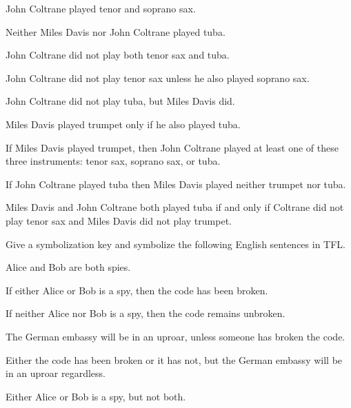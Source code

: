 \begin{compactlist}
\item John Coltrane played tenor and soprano sax. %
\item Neither Miles Davis nor John Coltrane played tuba. %
\item John Coltrane did not play both tenor sax and tuba.  %
\item John Coltrane did not play tenor sax unless he also played soprano sax. %
\item John Coltrane did not play tuba, but Miles Davis did. %
\item Miles Davis played trumpet only if he also played tuba. %
\item If Miles Davis played trumpet, then John Coltrane played at least one of these three instruments: tenor sax, soprano sax, or tuba. %
\item If John Coltrane played tuba then Miles Davis played neither trumpet nor tuba. %
\item Miles Davis and John Coltrane both played tuba if and only if Coltrane did not play tenor sax and Miles Davis did not play trumpet. %
\end{compactlist}

\solutions
\problempart
\label{pr.spies}
Give a symbolization key and symbolize the following English sentences in TFL.
\begin{compactlist}
\item Alice and Bob are both spies.
\item If either Alice or Bob is a spy, then the code has been broken.
\item If neither Alice nor Bob is a spy, then the code remains unbroken.
\item The German embassy will be in an uproar, unless someone has broken the code.
\item Either the code has been broken or it has not, but the German embassy will be in an uproar regardless.
\item Either Alice or Bob is a spy, but not both.
\end{compactlist}

